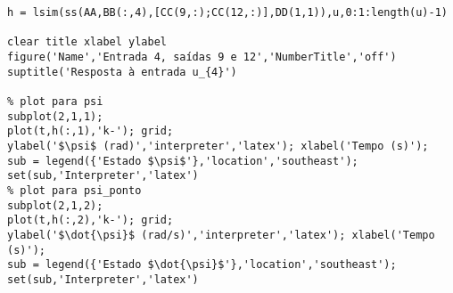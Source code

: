 \begin{lstlisting}[inputencoding=latin1]
% Gera gráficos de resposta a u4 - saídas 9 e 12
h = lsim(ss(AA,BB(:,4),[CC(9,:);CC(12,:)],DD(1,1)),u,0:1:length(u)-1)

clear title xlabel ylabel
figure('Name','Entrada 4, saídas 9 e 12','NumberTitle','off')
suptitle('Resposta à entrada u_{4}')

% plot para psi
subplot(2,1,1);
plot(t,h(:,1),'k-'); grid;
ylabel('$\psi$ (rad)','interpreter','latex'); xlabel('Tempo (s)');
sub = legend({'Estado $\psi$'},'location','southeast');
set(sub,'Interpreter','latex')
% plot para psi_ponto
subplot(2,1,2);
plot(t,h(:,2),'k-'); grid;
ylabel('$\dot{\psi}$ (rad/s)','interpreter','latex'); xlabel('Tempo (s)');
sub = legend({'Estado $\dot{\psi}$'},'location','southeast');
set(sub,'Interpreter','latex')
\end{lstlisting}